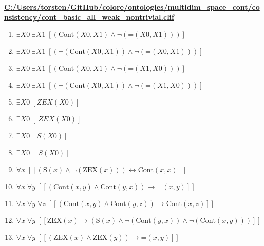 \documentclass{article}
\begin{document}
\textbf{\url{C:/Users/torsten/GitHub/colore/ontologies/multidim\_space\_cont/consistency/cont\_basic\_all\_weak\_nontrivial.clif}}

\begin{enumerate}
\item $\exists X0\; \exists X1\;  \left[ \left(\textrm{Cont}(X0,X1) \land \neg \left(\textrm{=}(X0,X1)\right)\right) \right]$
\item $\exists X0\; \exists X1\;  \left[ \left(\neg \left(\textrm{Cont}(X0,X1)\right) \land \neg \left(\textrm{=}(X0,X1)\right)\right) \right]$
\item $\exists X0\; \exists X1\;  \left[ \left(\textrm{Cont}(X0,X1) \land \neg \left(\textrm{=}(X1,X0)\right)\right) \right]$
\item $\exists X0\; \exists X1\;  \left[ \left(\neg \left(\textrm{Cont}(X0,X1)\right) \land \neg \left(\textrm{=}(X1,X0)\right)\right) \right]$
\item $\exists X0\;  \left[ ZEX(X0) \right]$
\item $\exists X0\;  \left[ ~ZEX(X0) \right]$
\item $\exists X0\;  \left[ S(X0) \right]$
\item $\exists X0\;  \left[ ~S(X0) \right]$
\item $\forall x\;  \left[ \left[ \left(\textrm{S}(x) \land \neg \left(\textrm{ZEX}(x)\right)\right) \leftrightarrow \textrm{Cont}(x,x) \right] \right]$
\item $\forall x\; \forall y\;  \left[ \left[ \left(\textrm{Cont}(x,y) \land \textrm{Cont}(y,x)\right) \rightarrow \textrm{=}(x,y) \right] \right]$
\item $\forall x\; \forall y\; \forall z\;  \left[ \left[ \left(\textrm{Cont}(x,y) \land \textrm{Cont}(y,z)\right) \rightarrow \textrm{Cont}(x,z) \right] \right]$
\item $\forall x\; \forall y\;  \left[ \left[ \textrm{ZEX}(x) \rightarrow \left(\textrm{S}(x) \land \neg \left(\textrm{Cont}(y,x)\right) \land \neg \left(\textrm{Cont}(x,y)\right)\right) \right] \right]$
\item $\forall x\; \forall y\;  \left[ \left[ \left(\textrm{ZEX}(x) \land \textrm{ZEX}(y)\right) \rightarrow \textrm{=}(x,y) \right] \right]$
\end{enumerate}
\end{document}
